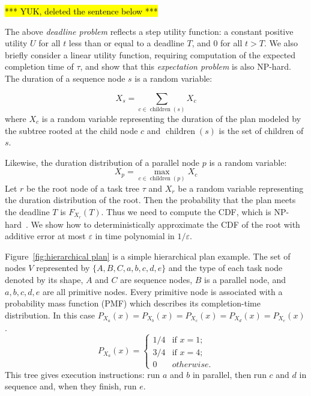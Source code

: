 \documentclass[review]{elsarticle}
\newtheorem{definition}{Definition}
\DeclareMathOperator{\ch}{\operatorname{children}}
\begin{document}

\hl{*** YUK, deleted the sentence below ***}

The above {\em deadline problem} reflects a step utility function: a 
constant positive utility $U$ for all $t$ less than or equal to a deadline 
$T$, and $0$ for all $t>T$. We also briefly consider a linear utility function, requiring
computation of the expected completion time of $\tau$, and show that this {\em expectation problem} 
is also NP-hard. 
The duration of a sequence node $s$ is a random variable:

$$
X_s = \sum_{c\in \ch(s)} X_c
$$
where $X_c$ is a random variable representing the duration of the plan modeled by the subtree rooted at the child node $c$ and $\ch(s)$ is the set of children of $s$.


Likewise, the duration distribution of a parallel node $p$ is a random variable:
$$
X_p = \max_{c\in \ch(p)} X_c
$$
Let $r$ be the root node of a task tree $\tau$ and $X_r$ be a random variable representing the duration distribution of the root.
Then the probability that the plan meets the deadline $T$ is $F_{X_r}(T)$.
Thus we need to compute the CDF, which is NP-hard~\cite{mohring2001scheduling}. We show how to deterministically approximate the CDF of the root with additive error at most $\varepsilon$ in time polynomial in $1/\varepsilon$.

Figure~\ref{fig:hierarchical plan} is a simple hierarchical plan example. The set of nodes $V$ represented by $\lbrace A,B,C,a,b,c,d,e \rbrace $ and the type of each task node denoted by its shape, $A$ and $C$ are sequence nodes, $ B $ is a parallel node, and $ a, b, c, d, e $ are all primitive nodes. Every primitive node is associated with a probability mass function (PMF) which describes its completion-time distribution. In this case $P_{X_a}(x)=P_{X_b}(x)=P_{X_c}(x)=P_{X_d}(x)=P_{X_e}(x)$.
$$P_{X_a}(x)=
\begin{cases}
1/4 & \text{if } x=1; \\
3/4 & \text{if } x=4; \\
0 & otherwise.
\end{cases}$$
This tree gives execution instructions: run $a$ and $b$ in parallel, then run $c$ and $d$ in sequence and, when they finish, run $e$.
\end{document}
